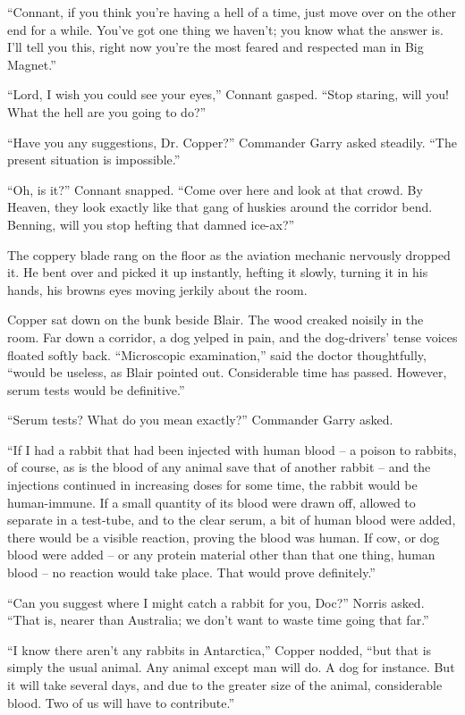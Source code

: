 \documentclass[letterpaper,openany,12pt]{memoir}		%
\begin{document}
``Connant, if you think you're having a hell of a time, just move over on the
other end for a while. You've got one thing we haven't; you know what the answer
is. I'll tell you this, right now you're the most feared and respected man in
Big Magnet.''

``Lord, I wish you could see your eyes,'' Connant gasped. ``Stop staring, will
you! What the hell are you going to do?''

``Have you any suggestions, Dr. Copper?'' Commander Garry asked steadily. ``The
present situation is impossible.''

``Oh, is it?'' Connant snapped. ``Come over here and look at that crowd. By
Heaven, they look exactly like that gang of huskies around the corridor bend.
Benning, will you stop hefting that damned ice-ax?''

The coppery blade rang on the floor as the aviation mechanic nervously dropped
it. He bent over and picked it up instantly, hefting it slowly, turning it in
his hands, his browns eyes moving jerkily about the room.

Copper sat down on the bunk beside Blair. The wood creaked noisily in the room.
Far down a corridor, a dog yelped in pain, and the dog-drivers' tense voices
floated softly back. ``Microscopic examination,'' said the doctor thoughtfully,
``would be useless, as Blair pointed out. Considerable time has passed. However,
serum tests would be definitive.''

``Serum tests? What do you mean exactly?'' Commander Garry asked.

``If I had a rabbit that had been injected with human blood -- a poison to
rabbits, of course, as is the blood of any animal save that of another rabbit --
and the injections continued in increasing doses for some time, the rabbit would
be human-immune. If a small quantity of its blood were drawn off, allowed to
separate in a test-tube, and to the clear serum, a bit of human blood were
added, there would be a visible reaction, proving the blood was human. If cow,
or dog blood were added -- or any protein material other than that one thing,
human blood -- no reaction would take place. That would prove definitely.''

``Can you suggest where I might catch a rabbit for you, Doc?'' Norris asked.
``That is, nearer than Australia; we don't want to waste time going that far.''

``I know there aren't any rabbits in Antarctica,'' Copper nodded, ``but that is
simply the usual animal. Any animal except man will do. A dog for instance. But
it will take several days, and due to the greater size of the animal,
considerable blood. Two of us will have to contribute.''
\end{document}
